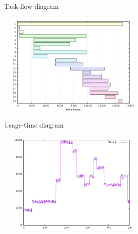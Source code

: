 \documentclass[18pt]{beamer}
\begin{document}
	\begin{frame}{Task-flow diagram}
		\begin{center}
			\includegraphics[width=280px, height=190px]{images/taskflow.png}
		\end{center}		
	\end{frame}
	
	\begin{frame}{Usage-time diagram}
		\begin{center}
			\includegraphics[width=280px, height=190px]{images/nodeusage.png}
		\end{center}		
	\end{frame}
	
\end{document}
